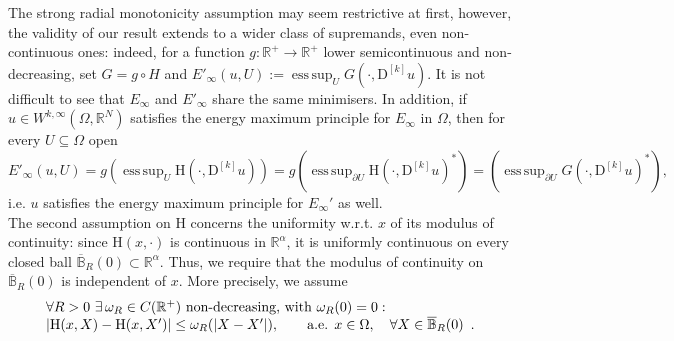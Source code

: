 \documentclass[a4paper,11pt]{article}
\numberwithin{equation}{section}
\newcommand{\numberset}{\mathbb}
\newcommand{\Om}{\Omega}
\newcommand{\R}{\numberset{R}}
\newcommand{\rom}{\mathrm}
\DeclareMathOperator*{\esssup}{ess\,sup}
\theoremstyle{definition}
\begin{document}
The strong radial monotonicity assumption may seem restrictive at first, however, the validity of our result extends to a wider class of supremands, even non-continuous ones: indeed, for a function $g:\R^+\to\R^+$ lower semicontinuous and non-decreasing, set $G=g\circ H$ and $E'_\infty(u,U):=\esssup_U G(\cdot,\mathrm D^{[k]} u)$. It is not difficult to see that $E_\infty$ and $E'_\infty$ share the same minimisers. In addition, if $u\in W^{k,\infty}(\Om,\R^N)$ satisfies the energy maximum principle for $E_\infty$ in $\Om$, then for every $U\subseteq\Om$ open
$$
E'_\infty(u,U)=g\left(\esssup_U \rom{H}(\cdot, \mathrm D^{[k]}u)\right)=g\left(\esssup_{\partial U}\rom{H}(\cdot, \mathrm D^{[k]}u)^*\right)=\left(\esssup_{\partial U}G(\cdot, \mathrm D^{[k]}u)^*\right),
$$ 
i.e. $u$ satisfies the energy maximum principle for $E_\infty'$ as well.\\
The second assumption on $\rom{H}$ concerns the uniformity w.r.t. $x$ of its modulus of continuity: since $\rom{H}(x,\cdot)$ is continuous in $\R^\alpha$, it is uniformly continuous on every closed ball $\overline{\mathbb B}_R(0)\subset\R^\alpha$. Thus, we require that the modulus of continuity on $\overline{\mathbb B}_R(0)$ is independent of $x$. More precisely, we assume
\begin{equation}\label{uniformity}
\begin{array}{l}
\forall R>0 \,\,\exists\, \omega_R\in C(\mathbb{R}^+)\ \text{non-decreasing, with } \omega_R(0)=0: \\
\multicolumn{1}{c}{|\rom{H}(x,X)-\rom{H}(x,X')|\leq\omega_R(|X-X'|),\qquad \text{a.e. } x\in\Omega,\quad\forall X\in \overline{\mathbb B}_R(0)}.
\end{array}
\end{equation}
\end{document}
